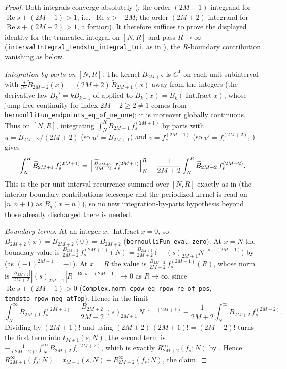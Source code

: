 \begin{proof}
\leanok
{}
Both integrals converge absolutely (: the order-$(2M+1)$
integrand for $\operatorname{Re} s + (2M+1) > 1$, i.e.\ $\operatorname{Re} s > -2M$; the
order-$(2M+2)$ integrand for $\operatorname{Re} s + (2M+2) > 1$, a fortiori). It therefore
suffices to prove the displayed identity for the truncated integral on $[N,R]$ and pass
$R \to \infty$ (\texttt{intervalIntegral\_tendsto\_integral\_Ioi}, as in
), the $R$-boundary contribution vanishing as below.

\emph{Integration by parts on $[N,R]$.} The kernel $\widetilde{B}_{2M+2}$ is $C^1$ on each
unit subinterval with $\frac{d}{dx}\widetilde{B}_{2M+2}(x) = (2M+2)\,\widetilde{B}_{2M+1}(x)$
away from the integers (the derivative law $B_{k}' = k B_{k-1}$ of 
applied to $\widetilde{B}_{k}(x) = B_k(\operatorname{Int.fract} x)$, whose jump-free
continuity for index $2M+2 \ge 2 \ne 1$ comes from
\texttt{bernoulliFun\_endpoints\_eq\_of\_ne\_one}); it is moreover globally continuous. Thus
on $[N,R]$, integrating $\int_N^R \widetilde{B}_{2M+1}\,f_s^{(2M+1)}$ by parts with
$u = \widetilde{B}_{2M+2}/(2M+2)$ (so $u' = \widetilde{B}_{2M+1}$) and $v = f_s^{(2M+1)}$
(so $v' = f_s^{(2M+2)}$, ) gives
\[
  \int_N^R \widetilde{B}_{2M+1}\,f_s^{(2M+1)}
  = \Bigl[\tfrac{\widetilde{B}_{2M+2}}{2M+2}\,f_s^{(2M+1)}\Bigr]_N^R
    - \frac{1}{2M+2}\int_N^R \widetilde{B}_{2M+2}\,f_s^{(2M+2)} .
\]
This is the per-unit-interval recurrence  summed over
$[N,R]$ exactly as in  (the interior boundary contributions
telescope and the periodized kernel is read on $[n,n+1)$ as $B_q(x-n)$), so no new
integration-by-parts hypothesis beyond those already discharged there is needed.

\emph{Boundary terms.} At an integer $x$, $\operatorname{Int.fract} x = 0$, so
$\widetilde{B}_{2M+2}(x) = B_{2M+2}(0) = B_{2M+2}$ (\texttt{bernoulliFun\_eval\_zero}). At
$x = N$ the boundary value is $\tfrac{B_{2M+2}}{2M+2}\,f_s^{(2M+1)}(N)
= \tfrac{B_{2M+2}}{2M+2}\,\bigl(-(s)_{2M+1}N^{-s-(2M+1)}\bigr)$ by 
(as $(-1)^{2M+1} = -1$). At $x = R$ the value is
$\tfrac{B_{2M+2}}{2M+2}\,f_s^{(2M+1)}(R)$, whose norm is
$\tfrac{|B_{2M+2}|}{2M+2}|(s)_{2M+1}|R^{-\operatorname{Re}s-(2M+1)} \to 0$ as $R \to \infty$,
since $\operatorname{Re} s + (2M+1) > 0$ (\texttt{Complex.norm\_cpow\_eq\_rpow\_re\_of\_pos},
\texttt{tendsto\_rpow\_neg\_atTop}). Hence in the limit
\[
  \int_N^{\infty} \widetilde{B}_{2M+1}\,f_s^{(2M+1)}
  = \frac{B_{2M+2}}{2M+2}\,(s)_{2M+1}\,N^{-s-(2M+1)}
    - \frac{1}{2M+2}\int_N^{\infty}\widetilde{B}_{2M+2}\,f_s^{(2M+2)} .
\]
Dividing by $(2M+1)!$ and using $(2M+2)\,(2M+1)! = (2M+2)!$ turns the first term into
$t_{M+1}(s,N)$; the second term is $-\frac{1}{(2M+2)!}\int_N^{\infty}\widetilde{B}_{2M+2}\,f_s^{(2M+2)}$,
which is exactly $R^{\infty}_{2M+2}(f_s;N)$ by . Hence
$R^{\infty}_{2M+1}(f_s;N) = t_{M+1}(s,N) + R^{\infty}_{2M+2}(f_s;N)$, the claim.
\end{proof}

